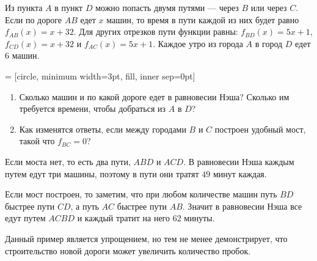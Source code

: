 \begin{problem}
Из пункта $A$ в пункт $D$ можно попасть двумя путями --- через $B$ или
через $C$. Если по дороге $AB$ едет $x$ машин, то время в пути каждой
из них будет равно $f_{AB}(x)=x+32$. Для других отрезков пути
функции равны: $f_{BD}(x)=5x+1$, $f_{CD}(x)=x+32$ и
$f_{AC}(x)=5x+1$.
Каждое утро из города $A$ в город $D$ едет 6 машин. 

 = [circle, minimum width=3pt, fill, inner sep=0pt]



\begin{enumerate}
\item Сколько машин и по какой дороге едет в равновесии  Нэша?
Сколько им требуется времени, чтобы добраться из $A$ в $D$? 
\item  Как изменятся ответы, если между городами $B$ и $C$ построен удобный мост, такой что $f_{BC}=0$? 
\end{enumerate}
\end{problem}

\begin{solution}
Если моста нет, то есть два пути, $ABD$ и $ACD$. В равновесии Нэша каждым путем едут три машины, поэтому в пути они тратят $49$ минут каждая.

Если мост построен, то заметим, что при любом количестве машин путь $BD$ быстрее пути $CD$, а путь $AC$ быстрее пути $AB$. Значит в равновесии Нэша все едут путем $ACBD$ и каждый тратит на него $62$ минуты.

Данный пример является упрощением, но тем не менее демонстрирует, что строительство новой дороги может увеличить количество пробок.
\end{solution}




